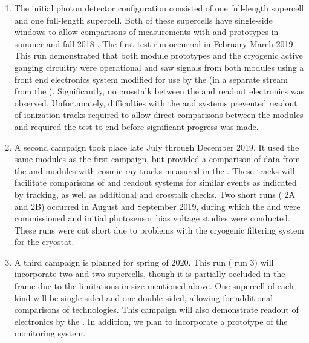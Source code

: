 \begin{enumerate}
    \item The initial photon detector configuration consisted of one full-length  supercell and one full-length  supercell.  Both of these supercells have single-side windows to allow comparisons of measurements with  and  prototypes in summer and fall 2018 .  
    The first test run occurred in February-March 2019. This run demonstrated that both module prototypes and the cryogenic active ganging circuitry were operational and saw signals from both modules using a  front end electronics system modified for use by the   (in a separate stream from the  ). Significantly, no crosstalk between the  and  readout electronics was observed.  Unfortunately, difficulties with the   and  systems prevented readout of ionization tracks required to allow direct comparisons between the  modules and required the test to end before significant progress was made.


    \item A second campaign took place late July through December 2019. It used the same  modules as the first campaign, but  provided a comparison of data from the  and  modules with cosmic ray tracks measured in the .  These tracks will facilitate comparisons of  and  readout systems for similar events as indicated by  tracking, as well as additional  and  crosstalk checks.  Two short runs ( 2A and 2B) occurred in August and September 2019, during which the  and  were commissioned and initial photosensor bias voltage studies were conducted.  These runs were cut short due to problems with the cryogenic filtering system for the  cryostat.

    \item A third campaign is planned for spring of 2020.  This run ( run 3) will incorporate two  and two  supercells, though it is partially occluded in the frame due to the limitations in  size mentioned above.  One supercell of each kind will be single-sided and one double-sided, allowing for additional comparisons of  technologies.  This campaign will also demonstrate readout of  electronics by the  .  In addition, we plan to incorporate a prototype of the   monitoring system.
    
\end{enumerate}

